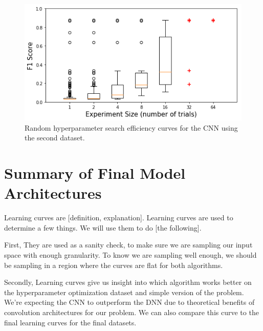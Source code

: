 \begin{figure}[H]
	\centering
	\includegraphics[width=0.8\linewidth]{images/random_hp_search_cnn_full}
	\caption{Random hyperparameter search efficiency curves for the CNN using the second dataset.}
	\label{fig:random_hp_search_cnn_full}
\end{figure}








\section{Summary of Final Model Architectures}

Learning curves are [definition, explanation]. Learning curves are used to determine a few things. We will use them to do [the following].

First, They are used as a sanity check, to make sure we are sampling our input space with enough granularity. To know we are sampling well enough, we should be sampling in a region where the curves are flat for both algorithms.

Secondly, Learning curves give us insight into which algorithm works better on the hyperparameter optimization dataset and simple version of the problem. We're expecting the CNN to outperform the DNN due to theoretical benefits of convolution architectures for our problem. We can also compare this curve to the final learning curves for the final datasets.



